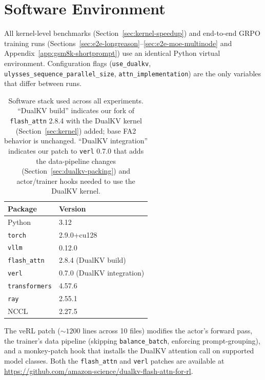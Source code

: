 \documentclass{article}
\begin{document}
\section{Software Environment}
\label{app:software-stack}

All kernel-level benchmarks (Section~\ref{sec:kernel-speedup}) and end-to-end GRPO training runs (Sections~\ref{sec:e2e-longreason}--\ref{sec:e2e-moe-multinode} and Appendix~\ref{app:gsm8k-shortprompt}) use an identical Python virtual environment. Configuration flags (\texttt{use\_dualkv}, \texttt{ulysses\_sequence\_parallel\_size}, \texttt{attn\_implementation}) are the only variables that differ between runs.

\begin{table}[ht]
\centering
\small
\caption{Software stack used across all experiments. ``DualKV build'' indicates our fork of \texttt{flash\_attn} 2.8.4 with the DualKV kernel (Section~\ref{sec:kernel}) added; base FA2 behavior is unchanged. ``DualKV integration'' indicates our patch to \texttt{verl} 0.7.0 that adds the data-pipeline changes (Section~\ref{sec:dualkv-packing}) and actor/trainer hooks needed to use the DualKV kernel.}
\label{tab:software-stack}
\begin{tabular}{@{}ll@{}}
\toprule
\textbf{Package} & \textbf{Version} \\
\midrule
Python               & 3.12 \\
\texttt{torch}       & 2.9.0+cu128 \\
\texttt{vllm}        & 0.12.0 \\
\texttt{flash\_attn} & 2.8.4 (DualKV build) \\
\texttt{verl}        & 0.7.0 (DualKV integration) \\
\texttt{transformers}& 4.57.6 \\
\texttt{ray}         & 2.55.1 \\
NCCL                 & 2.27.5 \\
\bottomrule
\end{tabular}
\end{table}

The veRL patch (${\sim}1200$ lines across 10 files) modifies the actor's forward pass, the trainer's data pipeline (skipping \texttt{balance\_batch}, enforcing prompt-grouping), and a monkey-patch hook that installs the DualKV attention call on supported model classes. Both the \texttt{flash\_attn} and \texttt{verl} patches are available at \textcolor{blue}{\url{https://github.com/amazon-science/dualkv-flash-attn-for-rl}}.
\end{document}
